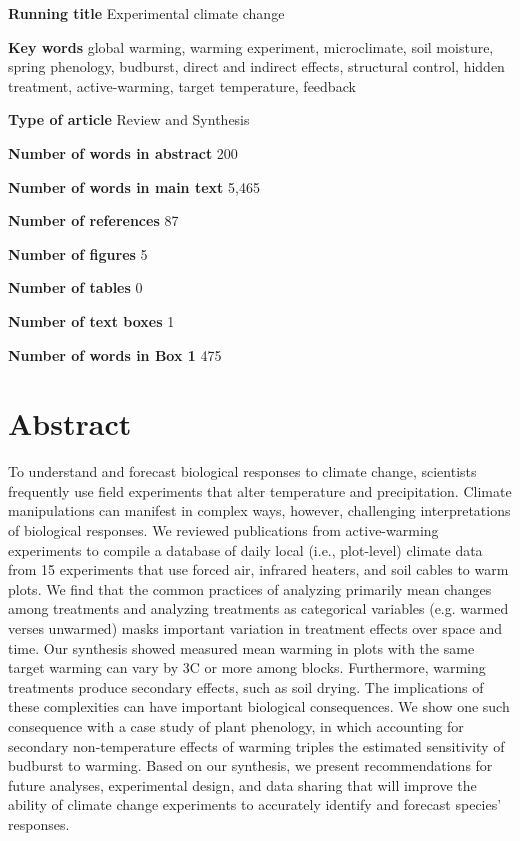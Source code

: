 \documentclass{article}
\begin{document}
\textbf{Running title} Experimental climate change

\textbf{Key words} global warming, warming experiment, microclimate, soil moisture, spring phenology, budburst, direct and indirect effects, structural control, hidden treatment, active-warming, target temperature, feedback

\textbf{Type of article} Review and Synthesis

\textbf{Number of words in abstract} 200

\textbf{Number of words in main text} 5,465%

\textbf{Number of references} 87

\textbf{Number of figures} 5

\textbf{Number of tables} 0

\textbf{Number of text boxes} 1

\textbf{Number of words in Box 1} 475

\clearpage

\clearpage
\linenumbers



\section*{Abstract}
\par To understand and forecast biological responses to climate change, scientists frequently use field experiments that alter temperature and precipitation. Climate manipulations can manifest in complex ways, however, challenging interpretations of biological responses. We reviewed publications from active-warming experiments to compile a database of daily local (i.e., plot-level) climate data from 15 experiments that use forced air, infrared heaters, and soil cables to warm plots. We find that the common practices of analyzing primarily mean changes among treatments and analyzing treatments as categorical variables (e.g. warmed verses unwarmed) masks important variation in treatment effects over space and time. Our synthesis showed measured mean warming in plots with the same target warming can vary by 3\degree C or more among blocks. Furthermore, warming treatments produce secondary effects, such as soil drying. The implications of these complexities can have important biological consequences. We show one such consequence with a case study of plant phenology, in which accounting for secondary non-temperature effects of warming triples the estimated sensitivity of budburst to warming. Based on our synthesis, we present recommendations for future analyses, experimental design, and data sharing that will improve the ability of climate change experiments to accurately identify and forecast species' responses.
\end{document}
